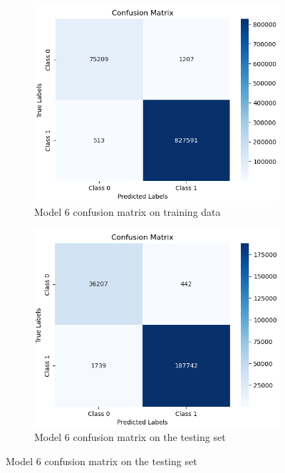 \begin{figure}[H]%
    \centering
    \begin{subfigure}{0.49\textwidth}
        \centering
        \includegraphics[width=\linewidth]{figures/ev/do_2_cm1.png}
        \caption{Model 6 confusion matrix on training data}
    \label{fig:do_2_cm1}
    \end{subfigure}
    \begin{subfigure}{0.49\textwidth}
        \centering
         \includegraphics[width=\linewidth]{figures/ev/do_2_cm2.png}
        \caption{Model 6 confusion matrix on the testing set}

\end{subfigure}
\end{figure}

